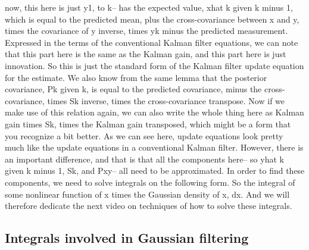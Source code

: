 now, this here is just y1, to k--
has the expected value, xhat k given
k minus 1, which is equal to the predicted mean,
plus the cross-covariance between x and y,
times the covariance of y inverse,
times yk minus the predicted measurement.
Expressed in the terms of the conventional Kalman filter
equations, we can note that this part here
is the same as the Kalman gain, and this part here
is just innovation.
So this is just the standard form
of the Kalman filter update equation for the estimate.
We also know from the same lemma that the posterior covariance,
Pk given k, is equal to the predicted covariance,
minus the cross-covariance, times Sk inverse,
times the cross-covariance transpose.
Now if we make use of this relation again,
we can also write the whole thing here
as Kalman gain times Sk, times the Kalman gain
transposed, which might be a form that you
recognize a bit better.
As we can see here, update equations
look pretty much like the update equations
in a conventional Kalman filter.
However, there is an important difference,
and that is that all the components here--
so yhat k given k minus 1, Sk, and Pxy--
all need to be approximated.
In order to find these components,
we need to solve integrals on the following form.
So the integral of some nonlinear
function of x times the Gaussian density of x, dx.
And we will therefore dedicate the next video
on techniques of how to solve these integrals.

\subsection{Integrals involved in Gaussian filtering}


